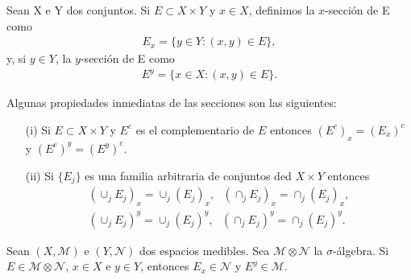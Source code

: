 \begin{defi}
    Sean X e Y dos conjuntos. Si $E \subset X \times Y$ y $x \in X$, definimos la $x$-sección de E como
    \begin{align*}
        E_x = \{ y \in Y : (x,y) \in E \},
    \end{align*}
    y, si $y \in Y$, la $y$-sección de E como
    \begin{align*}
        E^y = \{ x \in X : (x,y) \in E \}.
    \end{align*}
\end{defi}
Algunas propiedades inmediatas de las secciones son las siguientes:
\begin{enumerate}
    \item[(i)] Si $E \subset X \times Y$ y $E^c$ es el complementario de $E$ entonces $(E^c)_x = (E_x)^c$ y $(E^c)^y = (E^y)^c$.
    \item[(ii)] Si $\{E_j\}$ es una familia arbitraria de conjuntos ded $X \times Y$ entonces
          \begin{align*}
              (\cup_j E_j)_x = \cup_j (E_j)_x, \ \ \ (\cap_j E_j)_x = \cap_j (E_j)_x, \\
              (\cup_j E_j)^y = \cup_j (E_j)^y, \ \ \ (\cap_j E_j)^y = \cap_j (E_j)^y.
          \end{align*}
\end{enumerate}
\begin{prop}
    Sean $(X, \mathcal{M})$ e $(Y, \mathcal{N})$ dos espacios medibles. Sea $\mathcal{M} \otimes \mathcal{N}$ la $\sigma$-álgebra. Si $E \in \mathcal{M} \otimes \mathcal{N}$, $x \in X$ e $y \in Y$, entonces $E_x \in \mathcal{N}$ y $E^y \in \mathcal{M}$.
\end{prop}

